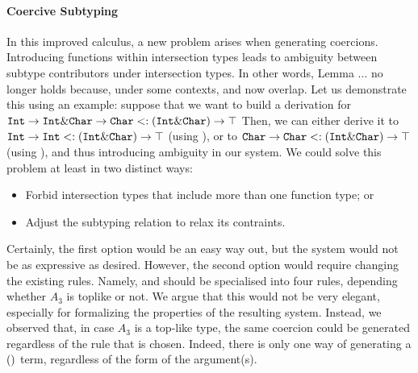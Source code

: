 
\paragraph{Coercive Subtyping}

In this improved calculus, a new problem arises when generating coercions. 
Introducing functions within intersection types leads to ambiguity between subtype contributors 
under intersection types.
In other words, Lemma ... no longer holds because, under some contexts, 
 and  now overlap. 
Let us demonstrate this using an example:
suppose that we want to build a derivation for  
$\texttt{Int} \to \texttt{Int} \& \texttt{Char} \to \texttt{Char} <: (\texttt{Int} \& \texttt{Char}) \to \top$
Then, we can either derive it to $\texttt{Int} \to \texttt{Int} <: (\texttt{Int} \& \texttt{Char}) \to \top$ 
(using ), or to $\texttt{Char} \to \texttt{Char} <: (\texttt{Int} \& \texttt{Char}) \to \top$
(using ), and thus introducing ambiguity in our system.
We could solve this problem at least in two distinct ways:

\begin{itemize}
\item Forbid intersection types that include more than one function type; or
\item Adjust the subtyping relation to relax its contraints. 
\end{itemize}

Certainly, the first option would be an easy way out, but the system would not be as expressive as desired.
However, the second option would require changing the existing rules.
Namely,  and  should be specialised into four rules, depending
whether $A_3$ is toplike or not.
We argue that this would not be very elegant, especially for formalizing the properties of the resulting system.
Instead, we observed that, in case $A_3$ is a top-like type, the same coercion could be generated regardless of 
the rule that is chosen.
Indeed, there is only one way of generating a $()$ term, regardless of the form of the argument(s).

